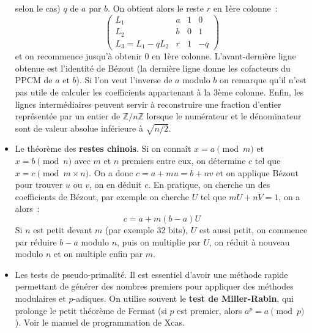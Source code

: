 \documentclass[a4paper,11pt]{article}
\newcommand{\Z}{{\mathbb{Z}}}
\begin{document}
\begin{itemize}
selon le cas) $q$
de $a$ par $b$. On obtient alors le reste $r$ en 1ère colonne~:
\[  \left( \begin{array}{rlll}
L_1 & a & 1 & 0 \\
L_2 & b & 0 & 1 \\
L_3=L_1-qL_2 & r & 1 & -q
\end{array} \right) \]
et on recommence jusqu'à obtenir 0 en 1ère colonne.
L'avant-dernière ligne obtenue est l'identité de Bézout (la dernière
ligne donne les cofacteurs du PPCM de $a$ et $b$). 
Si l'on veut l'inverse de $a$ modulo
$b$ on remarque qu'il n'est pas utile de calculer les coefficients
appartenant à la 3ème colonne. Enfin, les lignes intermédiaires
peuvent servir à reconstruire une fraction d'entier représentée
par un entier de $\Z/n\Z$ lorsque le numérateur et le dénominateur
sont de valeur absolue inférieure à $\sqrt{n/2}$.
\item Le théorème des {\bf restes chinois}. 
Si on connaît $x=a \pmod m$
et $x= b \pmod n $ avec $m$ et $n$ premiers entre eux,
on détermine $c$ tel que
$x=c \pmod{m\times n}$. On a donc $c=a+mu=b+nv$ et on applique
Bézout pour trouver $u$ ou $v$, on en d\'eduit $c$. En pratique,
on cherche un des coefficients de B\'ezout, par exemple on cherche $U$
tel que $mU+nV=1$, on a alors~:
\[ c=a+m (b-a)U \]
Si $n$ est petit devant $m$ (par exemple 32 bits), $U$ est aussi petit,
on commence par r\'eduire $b-a$ modulo $n$,
puis on multiplie par $U$, on r\'eduit à nouveau modulo $n$ et on
multiple enfin par $m$.
\item Les tests de pseudo-primalité. Il est essentiel d'avoir une
méthode rapide permettant de générer des nombres premiers pour appliquer
des méthodes modulaires et $p$-adiques. On utilise souvent le
{\bf test de Miller-Rabin}, qui prolonge le petit théorème de Fermat
(si $p$ est premier, alors $a^p=a \pmod p$). Voir le manuel de
programmation de Xcas.
\end{itemize}
\end{document}
